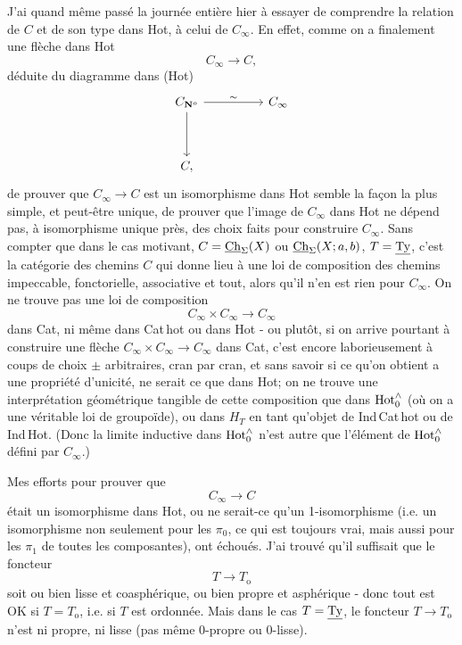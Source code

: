 J'ai quand même passé la journée entière hier à essayer de comprendre la relation de $C$ et de son type dans Hot, à celui de $C_{\infty}$. En effet, comme on a finalement une flèche dans Hot
\[
C_{\infty} \longrightarrow C,
\]
déduite du diagramme dans (Hot)
\[
\begin{tikzcd}[column sep=huge, row sep=huge]
\CNo \arrow[r, "\sim"] \arrow[d] & C_{\infty} \\
C, &
\end{tikzcd}
\]
de prouver que $C_{\infty} \longrightarrow C$ est un isomorphisme dans Hot
semble la façon la plus simple, et peut-être unique, de prouver que l'image de $C_{\infty}$ dans Hot ne dépend pas, à isomorphisme unique près, des choix faits pour construire $C_{\infty}$. Sans compter que dans le cas motivant, $C = \underline{\mathrm{Ch}}_{\Sigma}(X)$ ou $\underline{\mathrm{Ch}}_{\Sigma}(X;a,b)$, $T = \underline{\mathrm{Ty}}$, c'est la catégorie des chemins $C$ qui donne lieu à une loi de composition des chemins impeccable, fonctorielle, associative et tout, alors qu'il n'en est rien pour $C_{\infty}$. On ne trouve pas une loi de composition
\[
C_{\infty} \times C_{\infty} \longrightarrow C_{\infty}
\]
dans Cat, ni même dans Cat\,hot ou dans Hot - ou plutôt, si on arrive pourtant à construire une flèche $C_{\infty} \times C_{\infty} \longrightarrow C_{\infty}$ dans Cat, c'est encore laborieusement à coups de choix $\pm$ arbitraires, cran par cran, et sans savoir si ce qu'on obtient a une propriété d'unicité, ne serait ce que dans Hot; on ne trouve une interprétation géométrique tangible de cette composition que dans $\mathrm{Hot}^{\wedge}_{0}$ (où on a une véritable loi de groupoïde), ou dans $H_{T}$ en tant qu'objet de Ind\,Cat\,hot
ou de Ind\,Hot. (Donc la limite inductive dans $\mathrm{Hot}^{\wedge}_{0}$ n'est autre que l'élément de $\mathrm{Hot}^{\wedge}_{0}$ défini par $C_{\infty}$.)

Mes efforts pour prouver que
\[
C_{\infty} \longrightarrow C
\]
était un isomorphisme dans Hot, ou ne serait-ce qu'un 1-isomorphisme (i.e. un isomorphisme non seulement pour les $\pi_{0}$, ce qui est toujours vrai, mais aussi pour les $\pi_{1}$ de toutes les composantes), ont échoués. J'ai trouvé qu'il suffisait que le foncteur %
\[
T \longrightarrow T_{\mathrm{o}}
\]
soit ou bien lisse et coasphérique, ou bien propre et asphérique - donc tout est OK si $T = T_{\mathrm{o}}$, i.e. si $T$ est ordonnée. Mais dans le cas $T = \underline{\mathrm{Ty}}$, le foncteur $T \longrightarrow T_{\mathrm{o}}$ n'est ni propre, ni lisse (pas même 0-propre ou 0-lisse).

